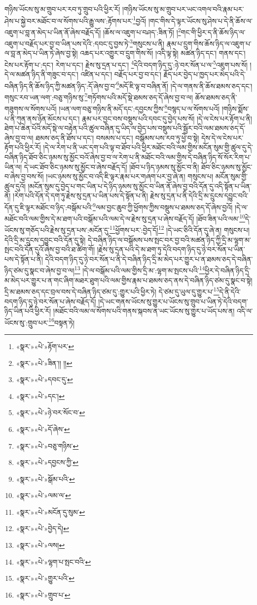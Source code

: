 གཉིས་ཡོངས་སུ་མ་གྲུབ་པར་རབ་ཏུ་གྲུབ་པའི་ཕྱིར་རོ། །གཉིས་ཡོངས་སུ་མ་གྲུབ་པར་ཡང་འགལ་བའི་རྣམ་པར་ཤེས་པ་སྐྱེ་བར་མཐོང་བ་ལ་སོགས་པའི་རྒྱུ་ལས་:རྟོགས་པར་\footnote{«སྣར་»«པེ་»རྟོག་པར་}བྱའོ། །གང་གིས་དེ་ལྟར་ཡོངས་སུ་ཤེས་པ་དེ་ནི་ཆོས་ལ་འཇུག་པ་བླ་ན་མེད་པ་ཡིན་ནོ་ཞེས་བརྗོད་དོ། །ཆོས་ལ་འཇུག་པ་བཤད་:ཟིན་ཏོ། །\footnote{«སྣར་»«པེ་»ཟིན་།། །།}གང་གི་ཕྱིར་ད་ནི་ཆོས་ཉིད་ལ་འཇུག་པ་བརྗོད་པར་བྱ་བ་ཡིན་པས་དེའི་:དབང་དུ་བྱས་ཏེ་\footnote{«སྣར་»«པེ་»དབང་དུ་}གསུངས་པ་ནི། རྣམ་པ་དྲུག་གིས་ཆོས་ཉིད་ལ་འཇུག་པ་ལ་བླ་ན་མེད་པ་ཡིན་ཏེ་ཞེས་བྱ་སྟེ། འཆད་པར་འགྱུར་བ་དྲུག་གིས་སོ། །འདི་ལྟ་སྟེ། མཚན་ཉིད་དང་། གནས་དང་། ངེས་པར་རྟོག་པ་:དང་། རེག་པ་དང་། རྗེས་སུ་དྲན་པ་དང་། \footnote{«སྣར་»«པེ་»དང་།  }དེའི་བདག་ཉིད་དུ་:ཉེ་བར་སོན་པ་ལ་\footnote{«སྣར་»«པེ་»ཉེ་བར་སོང་བ་}འཇུག་པས་སོ། །དེ་ལ་མཚན་ཉིད་ནི་གཟུང་བ་དང་། འཛིན་པ་དང་། བརྗོད་པར་བྱ་བ་དང་། རྗོད་པར་བྱེད་པ་ཁྱད་པར་མེད་པའི་དེ་བཞིན་ཉིད་ནི་ཆོས་ཉིད་ཀྱི་མཚན་ཉིད་:དོ་ཞེས་བྱ་བ་\footnote{«སྣར་»«པེ་»དོ་ཞེས་}མདོ་ཇི་ལྟ་བ་བཞིན་ནོ། །དེ་ལ་གནས་ནི་ཆོས་ཐམས་ཅད་དང་། གསུང་རབ་ཡན་ལག་:བཅུ་གཉིས་སུ་\footnote{«སྣར་»«པེ་»བཅུ་གཉིས་}གཏོགས་པའི་མདོ་སྡེ་ཐམས་ཅད་དོ་ཞེས་བྱ་བ་ལ། ཆོས་ཐམས་ཅད་ནི་གཟུགས་ལ་སོགས་པའོ། །ཡན་ལག་བཅུ་གཉིས་ནི་མདོ་དང་:དབྱངས་ཀྱིས་\footnote{«སྣར་»«པེ་»དབྱངས་ཀྱི་}བསྙད་པ་ལ་སོགས་པའོ། །གཉིས་སྨོས་པ་ནི་ཀུན་ནས་ཉོན་མོངས་པ་དང་། རྣམ་པར་བྱང་བས་བསྡུས་པའི་དབང་དུ་བྱེད་པས་སོ། །དེ་ལ་ངེས་པར་རྟོག་པ་ནི། ཐེག་པ་ཆེན་པོའི་མདོ་སྡེ་ལ་བརྟེན་པའི་ཚུལ་བཞིན་དུ་ཡིད་ལ་བྱེད་པས་བསྡུས་པའི་སྦྱོར་བའི་ལམ་ཐམས་ཅད་དོ་ཞེས་བྱ་བ་ལ། ཐམས་ཅད་ནི་ཐོས་པ་དང་། བསམས་པ་དང་། བསྒོམས་པས་རབ་ཏུ་ཕྱེ་བ་སྟེ། དེས་དེ་ལ་ངེས་པར་རྟོག་པའི་ཕྱིར་རོ། །དེ་ལ་རེག་པ་ནི་ཡང་དག་པའི་ལྟ་བ་ཐོབ་པའི་ཕྱིར་མཐོང་བའི་ལམ་གྱིས་མངོན་སུམ་གྱི་ཚུལ་དུ་དེ་བཞིན་ཉིད་ཐོབ་ཅིང་ཉམས་སུ་མྱོང་བའོ་ཞེས་བྱ་བ་ལ་རེག་པ་ནི་མཐོང་བའི་ལམ་གྱིས་དེ་བཞིན་ཉིད་སོ་སོར་རིག་པ་ཡིན་ལ། དེ་ཡང་ཐོབ་ཅིང་ཉམས་སུ་མྱོང་བ་ཞེས་བརྗོད་དོ། །ཐོབ་པ་ཉིད་ཉམས་སུ་མྱོང་བ་ནི། ཐོབ་ཅིང་ཉམས་སུ་མྱོང་བ་ཞེས་བྱ་བས་སོ། །ཡང་ཉམས་སུ་མྱོང་བ་འདི་ཇི་ལྟར་རྣམ་པར་གཞག་པར་བྱ་ཞེ་ན། གསུངས་པ། མངོན་སུམ་གྱི་ཚུལ་དུའོ། །མངོན་སུམ་དུ་བྱེད་པ་གང་ཡིན་པ་དེ་ཉིད་ཉམས་སུ་མྱོང་བ་ཡིན་ནོ་ཞེས་བྱ་བའི་དོན་དུ་འདི་སྟོན་པ་ཡིན་ནོ། །རེག་པའི་དོན་དེ་དག་ཏུ་རྗེས་སུ་དྲན་པ་ཡིན་པས་དེ་སྟོན་པ་ནི། རྗེས་སུ་དྲན་པ་ནི་དེའི་དྲི་མ་དྲུངས་དབྱུང་བའི་དོན་དུ་ཇི་ལྟར་མཐོང་བ་ཉིད་:བསྒོམ་པའི་\footnote{«སྣར་»«པེ་»སྒོམ་པའི་}ལམ་བྱང་ཆུབ་ཀྱི་ཕྱོགས་ཀྱིས་བསྡུས་པ་ཐམས་ཅད་དོ་ཞེས་བྱའོ། །དེ་ལ་མཐོང་བའི་ལམ་གྱིས་དེ་མ་ཐག་པའི་བསྒོམ་པའི་ལམ་དེ་ལ་རྗེས་སུ་དྲན་པ་ཞེས་བརྗོད་དོ། །ཐོབ་ཟིན་པའི་ལམ་\footnote{«སྣར་»«པེ་»ལམ་ལ་}དེ་ཡོངས་སུ་གཅོད་པའི་རྗེས་སུ་དྲན་པས་:མངོན་དུ་\footnote{«སྣར་»«པེ་»མངོན་དུ་སུམ་}ཕྱོགས་པར་:བྱེད་དོ།\footnote{«སྣར་»«པེ་»བྱེད་དེ།} །དེ་ཡང་ཅིའི་དོན་དུ་ཞེ་ན། གསུངས་པ། དེའི་དྲི་མ་དྲུངས་དབྱུང་བའི་དོན་དུ་སྟེ། དེ་བཞིན་ཉིད་ལ་བསྒོམས་པས་སྤང་བར་བྱ་བའི་མཚན་ཉིད་ཀྱི་དྲི་མ་ལྷག་མ་སྤང་བའི་དོན་དུའོ་ཞེས་བྱ་བའི་ཐ་ཚིག་གོ། །རྗེས་སུ་དྲན་པའི་དེ་མ་ཐག་ཏུ་དེའི་བདག་ཉིད་དུ་ཉེ་བར་སོན་པ་ཡིན་པས་དེ་སྟོན་པ་ནི། དེའི་བདག་ཉིད་དུ་ཉེ་བར་སོན་པ་ནི་དེ་བཞིན་ཉིད་དྲི་མ་མེད་པར་གྱུར་པ་ན་ཐམས་ཅད་དེ་བཞིན་ཉིད་ཙམ་དུ་སྣང་བ་ཞེས་བྱ་བ་ལ།\footnote{«སྣར་»«པེ་»ལས།} །དེ་ལ་བསྒོམ་པའི་ལམ་གྱིས་དྲི་མ་:ལྷག་མ་སྤངས་པའི་\footnote{«སྣར་»«པེ་»ལྷག་པ་སྤང་བའི་}ཕྱིར་དེ་བཞིན་ཉིད་དྲི་མ་མེད་པར་གྱུར་པ་ན་གང་ཞིག་མཐར་ཐུག་པའི་ལམ་གྱིས་རྣམ་པ་ཐམས་ཅད་ནས་དེ་བཞིན་ཉིད་ཙམ་དུ་སྣང་བ་སྟེ། དྲི་མ་ཐམས་ཅད་དང་བྲལ་བས་དེ་བཞིན་ཉིད་ཙམ་དུ་:གྱུར་པའི་ཕྱིར་ཏེ། དེ་ཙམ་དུ་ཡུལ་དུ་གྱུར་པ་\footnote{«སྣར་»«པེ་»གྱུར་པའི་}དེ་ནི་དེའི་བདག་ཉིད་དུ་ཉེ་བར་སོན་པ་ཞེས་བརྗོད་དོ། །དེ་ཡང་གནས་ཡོངས་སུ་གྱུར་པ་ཡོངས་སུ་གྲུབ་པ་ཡིན་ཏེ་དེའི་བདག་ཉིད་ཡིན་པའི་ཕྱིར་རོ། །མཐོང་བའི་ལམ་ལ་སོགས་པའི་གནས་སྐབས་ན་ཡང་ཡོངས་སུ་གྱུར་པ་ཡོད་པས་ན། འདི་ལ་ཡོངས་སུ་:གྲུབ་པར་\footnote{«སྣར་»«པེ་»གྲུབ་པ་}བསྟན་ཏེ། 